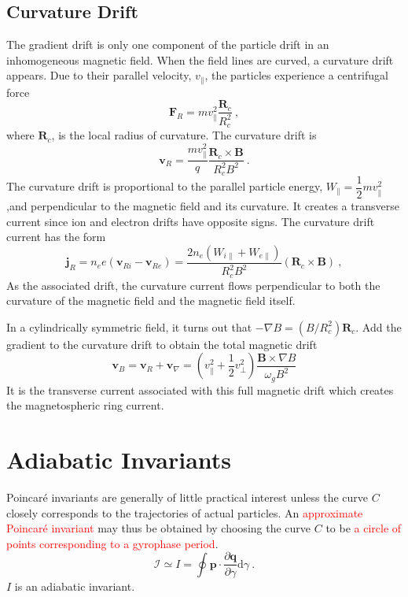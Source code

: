 \documentclass[12pt,a4paper]{article}
\renewcommand{\vec}[1]{\boldsymbol{#1}}
\newcommand{\dif}{\mathrm{d}}
\begin{document}
\subsection{Curvature Drift}
\cite{1996bspp.book.....B} The gradient drift is only one component of the particle drift in an inhomogeneous magnetic field. When the field lines are curved, a curvature drift appears. Due to their parallel velocity, $v_\parallel$, the particles experience a centrifugal force
\begin{equation}
\vec{F}_R = m v_\parallel^2 \dfrac{\vec{R}_c}{R_c^2} ~,
\end{equation}
where $\vec{R}_c$, is the local radius of curvature. The curvature drift is
\begin{equation}
\vec{v}_R = \dfrac{m v_\parallel^2}{q} \dfrac{\vec{R}_c \times \vec{B}}{R_c^2 B^2} ~.
\end{equation}
The curvature drift is proportional to the parallel particle energy, $W_\parallel = \dfrac{1}{2} mv_\parallel^2$,and perpendicular to the magnetic field and its curvature. It creates a transverse current since ion and electron drifts have opposite signs. The curvature drift current has the form
\begin{equation}
\vec{j}_R = n_e e (\vec{v}_{R i} - \vec{v}_{Re}) = \dfrac{2n_e (W_{i \parallel} +W_{e\parallel})}{R_c^2 B^2} (\vec{R}_c \times \vec{B}) ~,
\end{equation}
As the associated drift, the curvature current flows perpendicular to both the curvature of the magnetic field and the magnetic field itself.

In a cylindrically symmetric field, it turns out that $-\nabla B = (B/R_c^2)\vec{R}_c$. Add the gradient to the curvature drift to obtain the total magnetic drift
\begin{equation}
\vec{v}_B = \vec{v}_R +\vec{v}_\nabla = (v_\parallel^2 +\dfrac{1}{2} v_\perp^2) \dfrac{\vec{B} \times \nabla B}{\omega_g B^2}
\end{equation}
It is the transverse current associated with this full magnetic drift which creates the magnetospheric ring current.


\section{Adiabatic Invariants}
\cite{Plasma2014} Poincar\'e invariants are generally of little practical interest unless the curve $C$ closely corresponds to the trajectories of actual particles. An \textcolor{red}{approximate Poincar\'e invariant} may thus be obtained by choosing the curve $C$ to be \textcolor{red}{a circle of points corresponding to a gyrophase period}.
\begin{equation}
\mathcal I \simeq I = \oint \vec{p} \cdot \dfrac{\partial \vec{q}}{\partial \gamma} \dif \gamma ~.
\end{equation}
$I$ is an adiabatic invariant. 
\end{document}
